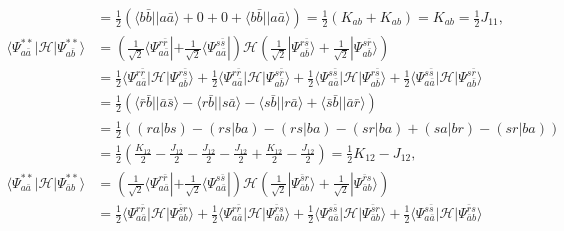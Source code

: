 \documentclass[a4paper]{book}
\newcounter{solution}[chapter]
\begin{document}
\begin{solution}
\begin{itemize}
\begin{align*}
		&= \frac{1}{2} \left( \langle b \bar{b} || a \bar{a} \rangle + 0 + 0 + \langle b \bar{b} || a \bar{a} \rangle \right) = \frac{1}{2} \left( K_{ab} + K_{ab} \right) = K_{ab} = \frac{1}{2} J_{11}, \\
		\langle \Psi^{**}_{a\bar{a}} | \mathscr{H} | \Psi^{**}_{a\bar{b}} \rangle &= \left( \frac{1}{ \sqrt{2} } \langle \Psi^{ r \bar{r} }_{a \bar{a}} | + \frac{1}{ \sqrt{2} } \langle \Psi^{ s \bar{s} }_{a \bar{a}} | \right) \mathscr{H} \left( \frac{1}{ \sqrt{2} } | \Psi^{ r \bar{s} }_{a \bar{b}} \rangle + \frac{1}{ \sqrt{2} } | \Psi^{ s \bar{r} }_{a \bar{b}} \rangle \right) \\
		&= \frac{1}{2} \langle \Psi^{ r \bar{r} }_{a \bar{a}} | \mathscr{H} | \Psi^{ r \bar{s} }_{a \bar{b}} \rangle + \frac{1}{2} \langle \Psi^{ r \bar{r} }_{a \bar{a}} | \mathscr{H} | \Psi^{ s \bar{r} }_{a \bar{b}} \rangle + \frac{1}{2} \langle \Psi^{ s \bar{s} }_{a \bar{a}} | \mathscr{H} | \Psi^{ r \bar{s} }_{a \bar{b}} \rangle + \frac{1}{2} \langle \Psi^{ s \bar{s} }_{a \bar{a}} | \mathscr{H} | \Psi^{ s \bar{r} }_{a \bar{b}} \rangle \\
		&= \frac{1}{2} \left( \langle \bar{r} \bar{b} || \bar{a} \bar{s} \rangle - \langle r \bar{b} || s \bar{a} \rangle - \langle s \bar{b} || r \bar{a} \rangle + \langle \bar{s} \bar{b} || \bar{a} \bar{r} \rangle \right) \\
		&= \frac{1}{2} \left( (ra|bs) - (rs|ba) - (rs|ba) - (sr|ba) + (sa|br) - (sr|ba) \right) \\
		&= \frac{1}{2} \left( \frac{ K_{12} }{2} - \frac{ J_{12} }{2} - \frac{ J_{12} }{2} - \frac{ J_{12} }{2} + \frac{ K_{12} }{2} - \frac{ J_{12} }{2} \right) = \frac{1}{2} K_{12} - J_{12}, \\
		\langle \Psi^{**}_{a\bar{a}} | \mathscr{H} | \Psi^{**}_{\bar{a} b} \rangle &= \left( \frac{1}{ \sqrt{2} } \langle \Psi^{ r \bar{r} }_{a \bar{a}} | + \frac{1}{ \sqrt{2} } \langle \Psi^{ s \bar{s} }_{a \bar{a}} | \right) \mathscr{H} \left( \frac{1}{ \sqrt{2} } | \Psi^{ \bar{s} r }_{\bar{a} b} \rangle + \frac{1}{ \sqrt{2} } | \Psi^{ \bar{r} s }_{\bar{a} b} \rangle \right) \\
		&= \frac{1}{2} \langle \Psi^{ r \bar{r} }_{a \bar{a}} | \mathscr{H} | \Psi^{ \bar{s} r }_{\bar{a} b} \rangle + \frac{1}{2} \langle \Psi^{ r \bar{r} }_{a \bar{a}} | \mathscr{H} | \Psi^{ \bar{r} s }_{ \bar{a} b } \rangle + \frac{1}{2} \langle \Psi^{ s \bar{s} }_{a \bar{a}} | \mathscr{H} | \Psi^{ \bar{s} r }_{ \bar{a} b } \rangle + \frac{1}{2} \langle \Psi^{ s \bar{s} }_{a \bar{a}} | \mathscr{H} | \Psi^{ \bar{r} s }_{ \bar{a} b } \rangle \\

\end{align*}
\end{itemize}
\end{solution}
\end{document}
